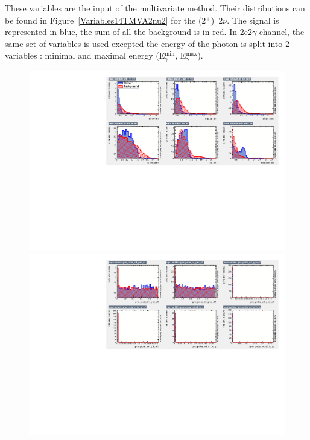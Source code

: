 \documentclass[main.tex]{subfiles}
\begin{document}
\NI These variables are the input of the multivariate method. Their distributions can be found in Figure~\ref{Variables14TMVA2nu2} for the (2$^+$)~2$\nu$. The signal is represented in blue, the sum of all the background is in red. In 2e2$\gamma$ channel, the same set of variables  is used excepted the energy of the photon is split into 2 variables : minimal and maximal energy (E$_{\gamma}^{\text{min}}$, E$_{\gamma}^{\text{max}}$).

\begin{figure} [h!]
\begin{center}
\includegraphics[scale=0.59]{pictures/FinalResults/bb2nu2/150/preselection/variablesBB2nu_2_a.pdf}
\includegraphics[scale=0.59]{pictures/FinalResults/bb2nu2/150/preselection/variablesBB2nu_2_b.pdf}

\end{center}
\end{figure}
\end{document}
